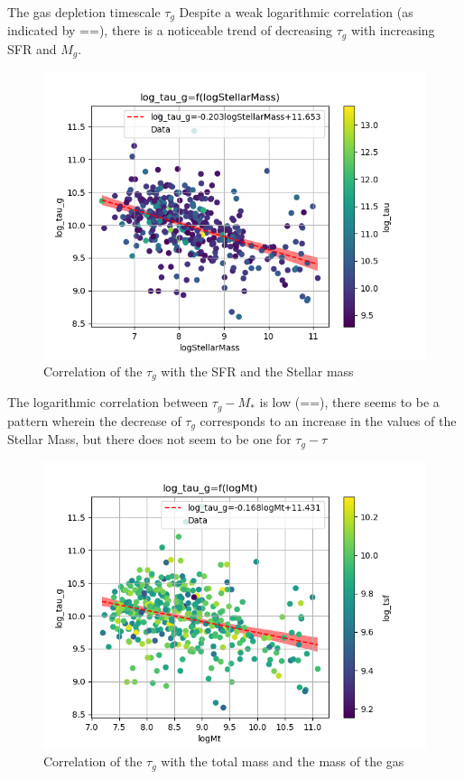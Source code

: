 \documentclass[presentation]{beamer}
\begin{document}
\begin{frame}[label={sec:org40e1c03}]{The gas depletion timescale \(\tau_g\) \label{SEC:tau_g}}
Despite a weak logarithmic correlation (as indicated by ==), there is a noticeable trend of decreasing \(\tau_g\) with increasing SFR and \(M_g\).


\begin{figure}[!htpb]
\centering
\includegraphics[width=.9\linewidth]{./figs/logStellarMass-log_tau_g-color_log_tau.png}
\caption{\label{fig:Correlation of the $\tau_g$ with the SFR and the Stellar mass}Correlation of the \(\tau_g\) with the SFR and the Stellar mass}
\end{figure}

The logarithmic correlation between \(\tau_g-M_*\) is low (==), there seems to be a pattern wherein the decrease of \(\tau_g\) corresponds to an increase in the values of the Stellar Mass, but there does not seem to be one for \(\tau_g-\tau\)


\begin{figure}[!htpb]
\centering
\includegraphics[width=.9\linewidth]{./figs/logMt-log_tau_g-color_log_tsf.png}
\caption{\label{fig:Correlation of the $\tau_g$ with the total mass and the mass of the gas}Correlation of the \(\tau_g\) with the total mass and the mass of the gas}
\end{figure}



\end{frame}
\end{document}
